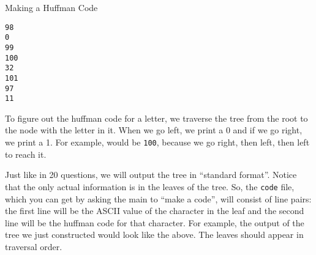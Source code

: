 \documentclass[programming]{../../mfcs}
\begin{document}
\begin{question}{Making a Huffman Code}
\vspace{1em}

\hspace*{5em}
\begin{minipage}{0.3\textwidth}
\end{minipage}
\hfill
\begin{minipage}{0.3\textwidth}
\renewcommand{\FancyVerbFormatLine}[1]{#1}
\begin{Verbatim}[fontsize=\small,frame=single,label=simple-spec-example.code]
98
0
99
100
32
101
97
11
\end{Verbatim}
\end{minipage}
\hspace*{5em}

\vspace{1em}

    \noindent To figure out the huffman code for a letter, we traverse the tree from the
    root to the node with the letter in it.  When we go left,  we print a 0 and if we go
    right, we print a 1.  For example,  would be \texttt{100}, because we
    go right, then left, then left to reach it.

    \vspace{0.5em}

    \noindent Just like in 20 questions, we will output the tree in ``standard format''.
    Notice that the only actual information is in the leaves of the tree.  So, the
    \texttt{code} file, which you can get by asking the main to ``make a code'', will
    consist of line pairs: the first line will be the ASCII value of the character in the
    leaf and the second line will be the huffman code for that character.  For example,
    the output of the tree we just constructed would look like the above.  The leaves should
    appear in traversal order.
\end{question}
\end{document}
